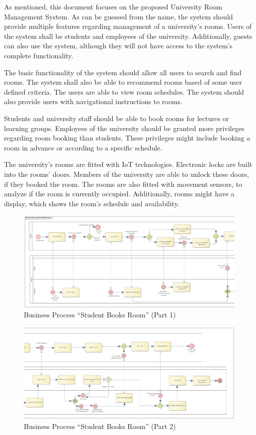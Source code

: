 \documentclass[conference,onecolumn]{IEEEtran}
\begin{document}
As mentioned, this document focuses on the proposed University Room Management System.
As can be guessed from the name, the system should provide multiple features regarding management of a university's rooms.
Users of the system shall be students and employees of the university. Additionally, guests can also use the system, although they will not have access to the system's complete functionality.

The basic functionality of the system should allow all users to search and find rooms. The system shall also be able to recommend rooms based of some user defined criteria. The users are able to view room schedules.
The system should also provide users with navigational instructions to rooms.

Students and university staff should be able to book rooms for lectures or learning groups. Employees of the university should be granted more privileges regarding room booking than students. These privileges might include booking a room in advance or according to a specific schedule.

The university's rooms are fitted with IoT technologies.
Electronic locks are built into the rooms' doors. Members of the university are able to unlock these doors, if they booked the room.
The rooms are also fitted with movement sensors, to analyze if the room is currently occupied.
Additionally, rooms might have a display, which shows the room's schedule and availability.

\begin{figure}
	\includegraphics[width=\linewidth]{Figures/BPMN_StudentBooksRoom_1.png}
	\caption{Business Process ``Student Books Room'' (Part 1)}
	\label{fig:bpmn_1}
\end{figure}

\begin{figure}
	\includegraphics[width=\linewidth]{Figures/BPMN_StudentBooksRoom_2.png}
	\caption{Business Process ``Student Books Room'' (Part 2)}
	\label{fig:bpmn_2}
\end{figure}
\end{document}
